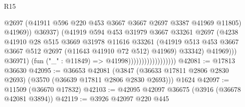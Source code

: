\begin{lexlean}{R15}
\begin{coremodule}
                                                  @2697
                                                  (@41911
                                                    @596
                                                    @220
                                                    @453
                                                    @3667
                                                    @3667
                                                    @2697
                                                    @3387
                                                    @41969
                                                    @11805)
                                                  @41969))
                                              @36937)
                                            (@41919
                                              @594
                                              @453
                                              @31979
                                              @3667
                                              @33261
                                              @2697
                                              (@4238
                                                @41910
                                                @28
                                                @515
                                                @3669
                                                @31978
                                                @11616
                                                @33261
                                                (@41919
                                                  @513
                                                  @453
                                                  @3667
                                                  @3667
                                                  @512
                                                  @2697
                                                  (@11643 @41910 @72 @512)
                                                  @41969)
                                                @33342)
                                              @41969)))
                                        @36971)
                                      (fun ("_" : @11849) => @41998))))))))))))))))))
@42081 := @17813 @36630
@42095 := @36653
    @42081
    (@3847 (@36633 @17811 @2806 @2830 @2693) (@3570 (@36639 @17811 @2806 @2830 @2693)))
    @1624
@42097 := @11509 (@36670 @17832)
@42103 := @42095 @42097 @36675 (@3916 (@36678 @42081 @3894))
@42119 := @3926
    @42097
    @220
    @445

\end{coremodule}
\end{lexlean}

